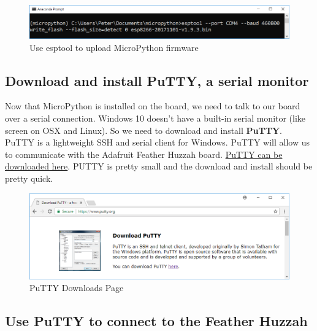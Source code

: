 \documentclass{book}
\makeatletter
\def\maxwidth{\ifdim\Gin@nat@width>\linewidth\linewidth
    \else\Gin@nat@width\fi}
\let\Oldincludegraphics\includegraphics
\renewcommand{\includegraphics}[1]{\Oldincludegraphics[width=.8\maxwidth]{#1}}
\makeatother
\begin{document}
\begin{figure}
\centering
\includegraphics{images/esptool_write_flash.PNG}
\caption{Use esptool to upload MicroPython firmware}
\end{figure}
    




    
        \subsection{Download and install PuTTY, a serial
monitor}\label{download-and-install-putty-a-serial-monitor}
    




    
        Now that MicroPython is installed on the board, we need to talk to our
board over a serial connection. Windows 10 doesn't have a built-in
serial monitor (like screen on OSX and Linux). So we need to download
and install \textbf{PuTTY}. PuTTY is a lightweight SSH and serial client
for Windows. PuTTY will allow us to communicate with the Adafruit
Feather Huzzah board. \href{https://www.putty.org/}{PuTTY can be
downloaded here}. PUTTY is pretty small and the download and install
should be pretty quick.

\begin{figure}
\centering
\includegraphics{images/download_putty.PNG}
\caption{PuTTY Downloads Page}
\end{figure}
    




    
        \subsection{Use PuTTY to connect to the Feather
Huzzah}\label{use-putty-to-connect-to-the-feather-huzzah}
    
\end{document}
